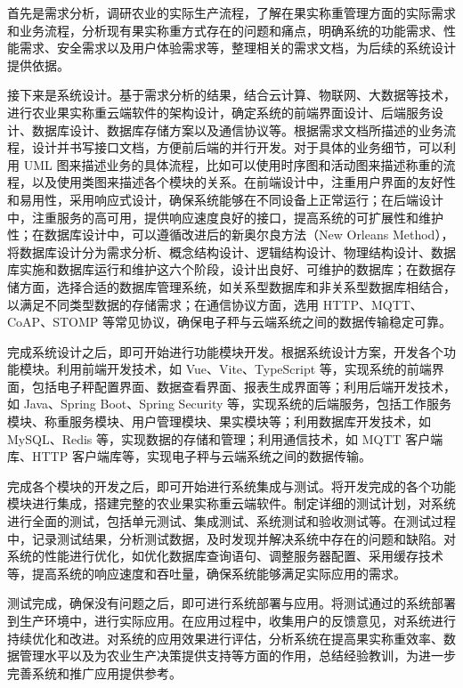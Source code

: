 首先是需求分析，调研农业的实际生产流程，了解在果实称重管理方面的实际需求和业务流程，分析现有果实称重方式存在的问题和痛点，明确系统的功能需求、性能需求、安全需求以及用户体验需求等，整理相关的需求文档，为后续的系统设计提供依据。

接下来是系统设计。基于需求分析的结果，结合云计算、物联网、大数据等技术，进行农业果实称重云端软件的架构设计，确定系统的前端界面设计、后端服务设计、数据库设计、数据库存储方案以及通信协议等。根据需求文档所描述的业务流程，设计并书写接口文档，方便前后端的并行开发。对于具体的业务细节，可以利用 UML 图来描述业务的具体流程，比如可以使用时序图和活动图来描述称重的流程，以及使用类图来描述各个模块的关系。在前端设计中，注重用户界面的友好性和易用性，采用响应式设计，确保系统能够在不同设备上正常运行；在后端设计中，注重服务的高可用，提供响应速度良好的接口，提高系统的可扩展性和维护性；在数据库设计中，可以遵循改进后的新奥尔良方法（New Orleans Method），将数据库设计分为需求分析、概念结构设计、逻辑结构设计、物理结构设计、数据库实施和数据库运行和维护这六个阶段，设计出良好、可维护的数据库\cite{苗雪兰2001数据库系统原理及应用教程}；在数据存储方面，选择合适的数据库管理系统，如关系型数据库和非关系型数据库相结合，以满足不同类型数据的存储需求；在通信协议方面，选用 HTTP、MQTT、CoAP、STOMP 等常见协议，确保电子秤与云端系统之间的数据传输稳定可靠。

完成系统设计之后，即可开始进行功能模块开发。根据系统设计方案，开发各个功能模块。利用前端开发技术，如 Vue、Vite、TypeScript 等，实现系统的前端界面，包括电子秤配置界面、数据查看界面、报表生成界面等；利用后端开发技术，如 Java、Spring Boot、Spring Security 等，实现系统的后端服务，包括工作服务模块、称重服务模块、用户管理模块、果实模块等；利用数据库开发技术，如 MySQL、Redis 等，实现数据的存储和管理；利用通信技术，如 MQTT 客户端库、HTTP 客户端库等，实现电子秤与云端系统之间的数据传输。

完成各个模块的开发之后，即可开始进行系统集成与测试。将开发完成的各个功能模块进行集成，搭建完整的农业果实称重云端软件。制定详细的测试计划，对系统进行全面的测试，包括单元测试、集成测试、系统测试和验收测试等。在测试过程中，记录测试结果，分析测试数据，及时发现并解决系统中存在的问题和缺陷。对系统的性能进行优化，如优化数据库查询语句、调整服务器配置、采用缓存技术等，提高系统的响应速度和吞吐量，确保系统能够满足实际应用的需求。

测试完成，确保没有问题之后，即可进行系统部署与应用。将测试通过的系统部署到生产环境中，进行实际应用。在应用过程中，收集用户的反馈意见，对系统进行持续优化和改进。对系统的应用效果进行评估，分析系统在提高果实称重效率、数据管理水平以及为农业生产决策提供支持等方面的作用，总结经验教训，为进一步完善系统和推广应用提供参考。

